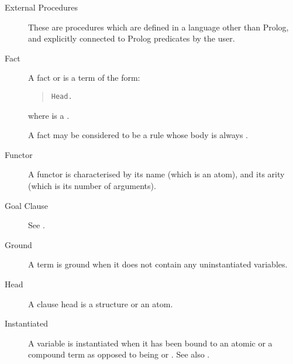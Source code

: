 \begin{description}

\item[External Procedures]
These are procedures which are defined in a language
other than Prolog, and explicitly connected to Prolog predicates by the user.

\item[Fact]
A fact or  is a term of the form:
\begin{quote}
\begin{verbatim}
Head.
\end{verbatim}
\end{quote}
where  is a .

A fact may be considered to be a rule whose body is always .

\item[Functor]
A functor is characterised by its name (which is an atom), and its arity
(which is its number of arguments).

\item[Goal Clause]
See .

\item[Ground]
A term is ground when it does not contain any uninstantiated variables.

\item[Head]
A clause head is a structure or an atom.

\item[Instantiated]
A variable is instantiated when it has been bound to an atomic or a
compound term as opposed to being %
or .
See also .



\end{description}
